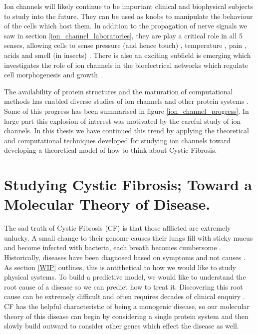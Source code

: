 Ion channels will likely continue to be important clinical and biophysical subjects to study into the future. They can be used as knobs to manipulate the behaviour of the cells which host them. In addition to the propagation of nerve signals we saw in section \ref{ion_channel_laboratories}, they are play a critical role in all 5 senses, allowing cells to sense pressure (and hence touch) \cite{chesler2018}, temperature \cite{castillo2018}, pain \cite{kingwell2019}, acids \cite{kweon2013} and smell (in insects) \cite{sato2008}. There is also an exciting subfield is emerging which investigates the role of ion channels in the bioelectrical networks which regulate cell morphogenesis and growth \cite{lang2005, sundelacruz2009, levin2014, levin2014a}.

The availability of protein structures and the maturation of computational methods has enabled diverse studies of ion channels and other protein systems \cite{lev2020, chen2021}. Some of this progress has been summarised in figure \ref{ion_channel_progress}. In large part this explosion of interest was motivated by the careful study of ion channels. In this thesis we have continued this trend by applying the theoretical and computational techniques developed for studying ion channels toward developing a theoretical model of how to think about Cystic Fibrosis. 

\section{Studying Cystic Fibrosis; Toward a Molecular Theory of Disease.} 

The sad truth of Cystic Fibrosis (CF) is that those afflicted are extremely unlucky. A small change to their genome causes their lungs fill with sticky mucus and become infected with bacteria, each breath becomes cumbersome \cite{katkin2022}. Historically, diseases have been diagnosed based on symptoms and not causes \cite{foucault1994}. As section \ref{WIP} outlines, this is antithetical to how we would like to study physical systems. To build a predictive model, we would like to understand the root cause of a disease so we can predict how to treat it. Discovering this root cause can be extremely difficult and often requires decades of clinical enquiry \cite{dubois2016, tsui2013}. CF has the helpful characteristic of being a monogenic disease, so our molecular theory of this disease can begin by considering a single protein system and then slowly build outward to  consider other genes which effect the disease as well.


